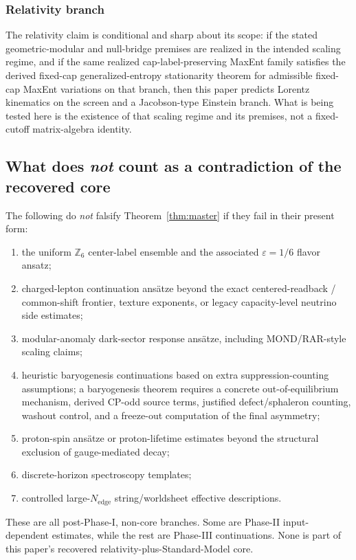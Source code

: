 \documentclass[11pt]{article}
\begin{document}
\subsubsection{Relativity branch}

The relativity claim is conditional and sharp about its scope: if the stated geometric-modular and null-bridge premises are realized in the intended scaling regime, and if the same realized cap-label-preserving MaxEnt family satisfies the derived fixed-cap generalized-entropy stationarity theorem for admissible fixed-cap MaxEnt variations on that branch, then this paper predicts Lorentz kinematics on the screen and a Jacobson-type Einstein branch. What is being tested here is the existence of that scaling regime and its premises, not a fixed-cutoff matrix-algebra identity.

\subsection{What does \emph{not} count as a contradiction of the recovered core}

The following do \emph{not} falsify Theorem~\ref{thm:master} if they fail in their present form:
\begin{enumerate}[leftmargin=2em]
\item the uniform $\mathbb Z_6$ center-label ensemble and the associated $\varepsilon=1/6$ flavor ansatz;
\item charged-lepton continuation ans\"atze beyond the exact centered-readback / common-shift frontier, texture exponents, or legacy capacity-level neutrino side estimates;
\item modular-anomaly dark-sector response ans\"atze, including MOND/RAR-style scaling claims;
\item heuristic baryogenesis continuations based on extra suppression-counting assumptions; a baryogenesis theorem requires a concrete out-of-equilibrium mechanism, derived CP-odd source terms, justified defect/sphaleron counting, washout control, and a freeze-out computation of the final asymmetry;
\item proton-spin ans\"atze or proton-lifetime estimates beyond the structural exclusion of gauge-mediated decay;
\item discrete-horizon spectroscopy templates;
\item controlled large-$N_{\mathrm{edge}}$ string/worldsheet effective descriptions.
\end{enumerate}
These are all post-Phase-I, non-core branches. Some are Phase-II input-dependent estimates, while the rest are Phase-III continuations. None is part of this paper's recovered relativity-plus-Standard-Model core.
\end{document}
